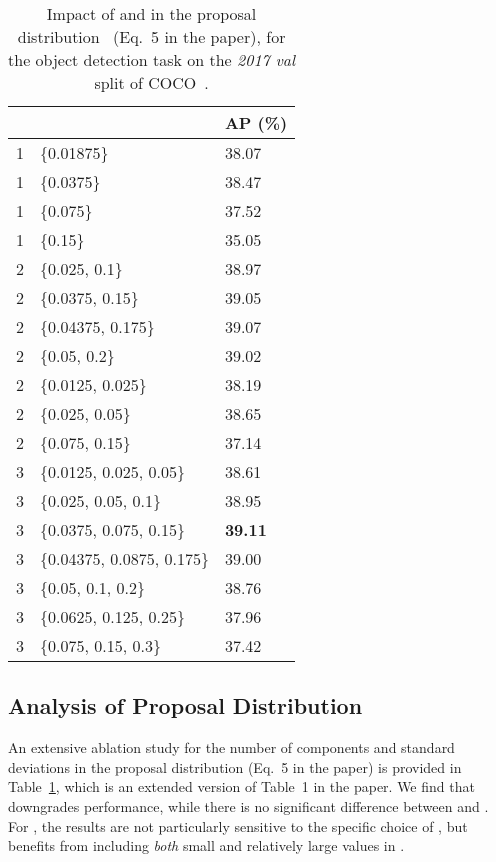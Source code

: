 \documentclass[runningheads]{llncs}
\begin{document}
\begin{appendices}
\begin{table}[t]
\begin{center}
\caption{Impact of  and  in the proposal distribution ~(Eq.~5 in the paper), for the object detection task on the \emph{2017 val} split of COCO~\cite{lin2014microsoft}.}
\begin{tabular}{|@{\hspace{0.5cm}}c@{\hspace{0.5cm}}|l@{\hspace{1cm}}|l@{\hspace{1cm}}|}
\multicolumn{1}{c}{} &\multicolumn{1}{c}{} &\multicolumn{1}{c}{AP (\%)}\\ 
\hline
1 &\{0.01875\} &38.07\\
1 &\{0.0375\} &38.47\\
1 &\{0.075\} &37.52\\
1 &\{0.15\} &35.05\\
\hline
\hline
2 &\{0.025, 0.1\} &38.97\\
2 &\{0.0375, 0.15\} &39.05\\
2 &\{0.04375, 0.175\} &39.07\\
2 &\{0.05, 0.2\} &39.02\\
\hline
2 &\{0.0125, 0.025\} &38.19\\
2 &\{0.025, 0.05\} &38.65\\
2 &\{0.075, 0.15\} &37.14\\
\hline
\hline
3 &\{0.0125, 0.025, 0.05\} &38.61\\
3 &\{0.025, 0.05, 0.1\} &38.95\\
3 &\{0.0375, 0.075, 0.15\} &\textbf{39.11}\\
3 &\{0.04375, 0.0875, 0.175\} &39.00\\
3 &\{0.05, 0.1, 0.2\} &38.76\\
3 &\{0.0625, 0.125, 0.25\} &37.96\\
3 &\{0.075, 0.15, 0.3\} &37.42\\
\hline
\end{tabular}\vspace{-3mm}
\label{table:detection_ablation_full}\end{center}
\end{table}





\subsection{Analysis of Proposal Distribution}
An extensive ablation study for the number of components  and standard deviations  in the proposal distribution  (Eq.~5 in the paper) is provided in Table~\ref{table:detection_ablation_full}, which is an extended version of Table~1 in the paper. We find that  downgrades performance, while there is no significant difference between  and . For , the results are not particularly sensitive to the specific choice of , but benefits from including \emph{both} small and relatively large values in .









\end{appendices}
\end{document}
